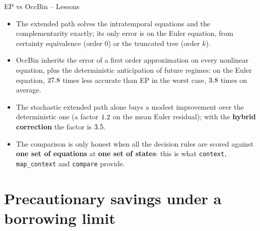 \documentclass[11pt,aspectratio=169]{beamer}
\newcommand{\code}[1]{\texttt{#1}}
\begin{document}
\begin{frame}{EP vs OccBin -- Lessons}

\begin{itemize}

\item The extended path solves the intratemporal equations and the complementarity exactly; its only error is on the Euler equation, from certainty equivalence (order 0) or the truncated tree (order $k$).\newline

\item OccBin inherits the error of a first order approximation on every nonlinear equation, plus the deterministic anticipation of future regimes: on the Euler equation, $27.8$ times less accurate than EP in the worst case, $3.8$ times on average.\newline

\item The stochastic extended path alone buys a modest improvement over the deterministic one (a factor $1.2$ on the mean Euler residual); with the \textbf{hybrid correction} the factor is $3.5$.\newline

\item The comparison is only honest when all the decision rules are scored against \textbf{one set of equations} at \textbf{one set of states}: this is what \code{context}, \code{map\_context} and \code{compare} provide.

\end{itemize}

\end{frame}

\section{Precautionary savings under a borrowing limit}
\end{document}
